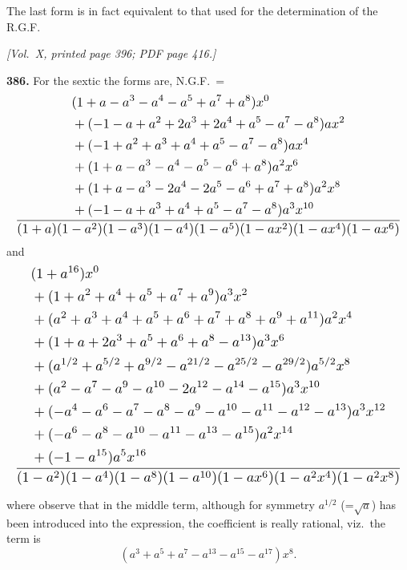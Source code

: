 \documentclass[11pt]{article}
\begin{document}
\medskip

\noindent The last form is in fact equivalent to that used for the determination of the R.G.F.

\medskip

\newpage

\noindent\textit{[Vol.~X, printed page 396; PDF page 416.]}

\medskip

\noindent\textbf{386.} For the sextic the forms are, N.G.F.\ =
\[
\resizebox{\textwidth}{!}{$\displaystyle
\frac{
\begin{aligned}
&(1+a-a^{3}-a^{4}-a^{5}+a^{7}+a^{8})x^{0}\\
&+(-1-a+a^{2}+2a^{3}+2a^{4}+a^{5}-a^{7}-a^{8})ax^{2}\\
&+(-1+a^{2}+a^{3}+a^{4}+a^{5}-a^{7}-a^{8})ax^{4}\\
&+(1+a-a^{3}-a^{4}-a^{5}-a^{6}+a^{8})a^{2}x^{6}\\
&+(1+a-a^{3}-2a^{4}-2a^{5}-a^{6}+a^{7}+a^{8})a^{2}x^{8}\\
&+(-1-a+a^{3}+a^{4}+a^{5}-a^{7}-a^{8})a^{3}x^{10}
\end{aligned}
}{
(1+a)(1-a^{2})(1-a^{3})(1-a^{4})(1-a^{5})(1-ax^{2})(1-ax^{4})(1-ax^{6})
}
$}
\]
and
\[
\resizebox{\textwidth}{!}{$\displaystyle
\frac{
\begin{aligned}
&(1+a^{16})x^{0}\\
&+(1+a^{2}+a^{4}+a^{5}+a^{7}+a^{9})a^{3}x^{2}\\
&+(a^{2}+a^{3}+a^{4}+a^{5}+a^{6}+a^{7}+a^{8}+a^{9}+a^{11})a^{2}x^{4}\\
&+(1+a+2a^{3}+a^{5}+a^{6}+a^{8}-a^{13})a^{3}x^{6}\\
&+(a^{1/2}+a^{5/2}+a^{9/2}-a^{21/2}-a^{25/2}-a^{29/2})a^{5/2}x^{8}\\
&+(a^{2}-a^{7}-a^{9}-a^{10}-2a^{12}-a^{14}-a^{15})a^{3}x^{10}\\
&+(-a^{4}-a^{6}-a^{7}-a^{8}-a^{9}-a^{10}-a^{11}-a^{12}-a^{13})a^{3}x^{12}\\
&+(-a^{6}-a^{8}-a^{10}-a^{11}-a^{13}-a^{15})a^{2}x^{14}\\
&+(-1-a^{15})a^{5}x^{16}
\end{aligned}
}{
(1-a^{2})(1-a^{4})(1-a^{8})(1-a^{10})(1-ax^{6})(1-a^{2}x^{4})(1-a^{2}x^{8})
}
$}
\]

\medskip

where observe that in the middle term, although for symmetry $a^{1/2}$ (=$\sqrt{a}$) has been introduced into the expression, the coefficient is really rational, viz.\ the term is
\[
(a^{3}+a^{5}+a^{7}-a^{13}-a^{15}-a^{17})x^{8}.
\]
\end{document}
